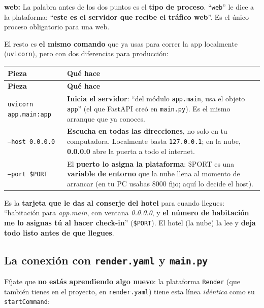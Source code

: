 \documentclass[11pt,a4paper]{article}
\begin{document}
\textbf{web: } La palabra antes de los dos puntos es el \textbf{tipo de proceso}. ``\texttt{web}''
le dice a la plataforma: ``\textbf{este es el servidor que recibe el tráfico web}''. Es el único
proceso obligatorio para una web.

El resto es \textbf{el mismo comando} que ya usas para correr la app localmente
(\texttt{uvicorn}), pero con dos diferencias para producción:

\begin{center}
{\small
\setlength{\tabcolsep}{4pt}
\begin{longtable}{@{}>{\raggedright\arraybackslash}p{5.2cm}>{\raggedright\arraybackslash}p{9.6cm}@{}}
\toprule
\textbf{Pieza} & \textbf{Qué hace} \\
\midrule
\endfirsthead
\toprule
\textbf{Pieza} & \textbf{Qué hace} \\
\midrule
\endhead
\texttt{uvicorn app.main:app} & \textbf{Inicia el servidor}: ``del módulo
\texttt{app.main}, usa el objeto \texttt{app}'' (el que FastAPI creó en \texttt{main.py}). Es el
mismo arranque que ya conoces. \\
\texttt{--host 0.0.0.0} & \textbf{Escucha en todas las direcciones}, no solo en tu computadora.
Localmente basta \texttt{127.0.0.1}; en la nube, \textbf{0.0.0.0} abre la puerta a todo el
internet. \\
\texttt{--port \$PORT} & El \textbf{puerto lo asigna la plataforma}: \$PORT es una \textbf{variable
de entorno} que la nube llena al momento de arrancar (en tu PC usabas 8000 fijo; aquí lo
decide el host). \\
\bottomrule
\end{longtable}
}
\end{center}

\begin{analogia}
Es la \textbf{tarjeta que le das al conserje del hotel} para cuando llegues: ``habitación para
\emph{app.main}, con ventana \emph{0.0.0.0}, y \textbf{el número de habitación me lo asignas tú
al hacer check-in}'' (\texttt{\$PORT}). El hotel (la nube) la lee y \textbf{deja todo listo
antes de que llegues}.
\end{analogia}

\subsection{La conexión con \texttt{render.yaml} y \texttt{main.py}}

Fíjate que \textbf{no estás aprendiendo algo nuevo}: la plataforma \texttt{Render} (que también
tienes en el proyecto, en \texttt{render.yaml}) tiene esta línea \emph{idéntica} como su
\texttt{startCommand}:
\end{document}
